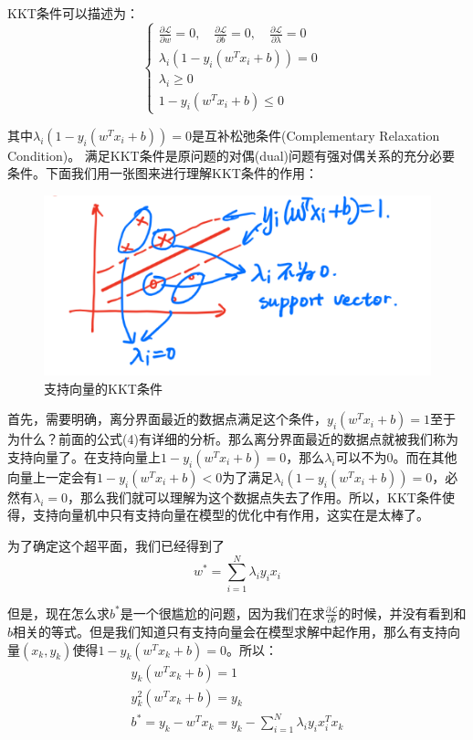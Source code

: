 \documentclass[a4paper]{article}
\begin{document}
KKT条件可以描述为：
\begin{equation}
    \left\{
    \begin{array}{ll}
          \frac{\partial \mathcal{L}}{\partial w} = 0,\quad
          \frac{\partial \mathcal{L}}{\partial b} = 0,\quad
          \frac{\partial \mathcal{L}}{\partial \lambda} = 0 & \\
          \lambda_i(1-y_i(w^Tx_i+b)) = 0 & \\
          \lambda_i \geq 0 & \\
          1-y_i(w^Tx_i+b) \leq 0 
    \end{array}
    \right.
\end{equation}

其中$\lambda_i(1-y_i(w^Tx_i+b)) = 0$是互补松弛条件(Complementary Relaxation Condition)。{\color{red} 满足KKT条件是原问题的对偶(dual)问题有强对偶关系的充分必要条件。}下面我们用一张图来进行理解KKT条件的作用：
\begin{figure}[H]
    \centering
    \includegraphics[width=.55\textwidth]{微信图片_20191114112701.png}
    \caption{支持向量的KKT条件}
    \label{fig:my_label_1}
\end{figure}

首先，需要明确，离分界面最近的数据点满足这个条件，$y_i(w^Tx_i+b)=1$至于为什么？前面的公式(4)有详细的分析。那么离分界面最近的数据点就被我们称为支持向量了。在支持向量上$1-y_i(w^Tx_i+b)=0$，那么$\lambda_i$可以不为0。而在其他向量上一定会有$1-y_i(w^Tx_i+b)<0$为了满足$\lambda_i(1-y_i(w^Tx_i+b)) = 0$，必然有$\lambda_i=0$，那么我们就可以理解为这个数据点失去了作用。所以，KKT条件使得，支持向量机中只有支持向量在模型的优化中有作用，这实在是太棒了。

为了确定这个超平面，我们已经得到了
\begin{equation}
    w^\ast = \sum_{i=1}^N \lambda_iy_ix_i
\end{equation}

但是，现在怎么求$b^\ast$是一个很尴尬的问题，因为我们在求$\frac{\partial \mathcal{L}}{\partial b}$的时候，并没有看到和$b$相关的等式。但是我们知道只有支持向量会在模型求解中起作用，那么有支持向量$(x_k,y_k)$使得$1-y_k(w^Tx_k+b)=0$。所以：
\begin{gather}
    y_k(w^Tx_k + b) = 1 \\
    y_k^2(w^Tx_k + b) = y_k \\
    b^\ast = y_k - w^Tx_k = y_k - \sum_{i=1}^N \lambda_iy_ix_i^T x_k
\end{gather}
\end{document}
